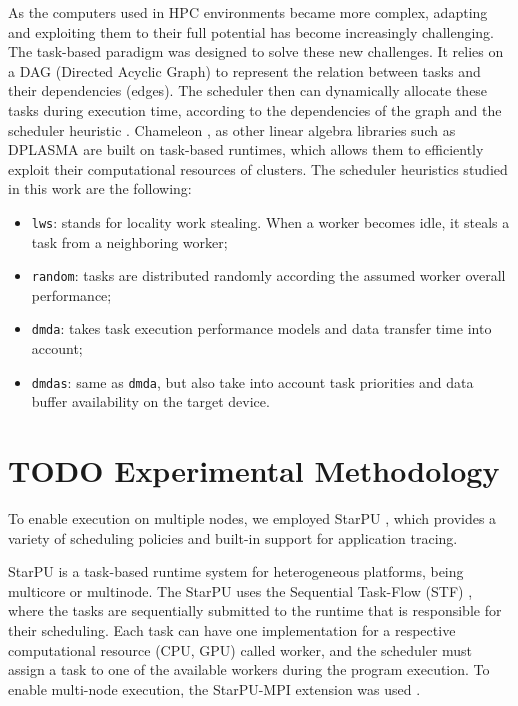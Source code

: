 \documentclass[conference, 10pt, final]{IEEEtran}
\begin{document}
As the computers used in HPC environments became more complex, adapting and exploiting them to their full potential has become increasingly challenging. The task-based paradigm was designed to solve these new challenges. It relies on a DAG (Directed Acyclic Graph) to represent the relation between tasks and their dependencies (edges). The scheduler then can dynamically allocate these tasks during execution time, according to the dependencies of the graph and the scheduler heuristic \cite{faverge2023programming}. Chameleon \cite{agullo:inria-00547847}, as other linear algebra libraries such as DPLASMA \cite{bosilca2011flexible} are built on task-based runtimes, which allows them to efficiently exploit their computational resources of clusters. The scheduler heuristics studied in this work are the following:

\begin{itemize}
\item \verb|lws|: stands for locality work stealing. When a worker becomes idle, it steals a task from a neighboring worker;

\item \verb|random|: tasks are distributed randomly according the assumed worker overall performance;

\item \verb|dmda|: takes task execution performance models and data transfer time into account;

\item \verb|dmdas|: same as \verb|dmda|, but also take into account task priorities and data buffer availability on the target device.

\end{itemize}
\section{{\bfseries\sffamily TODO} Experimental Methodology}
\label{sec:methodology}
To enable execution on multiple nodes, we employed StarPU \cite{augonnet2009starpu}, which provides a variety of scheduling policies and built-in support for application tracing.

StarPU is a task-based runtime system for heterogeneous platforms, being multicore or multinode. The StarPU uses the Sequential Task-Flow (STF) \cite{kennedy2001optimizing}, where the tasks are sequentially submitted to the runtime that is responsible for their scheduling. Each task can have one implementation for a respective computational resource (CPU, GPU) called worker, and the scheduler must assign a task to one of the available workers during the program execution. To enable multi-node execution, the StarPU-MPI extension was used \cite{augonnet2012starpu}.
\end{document}

